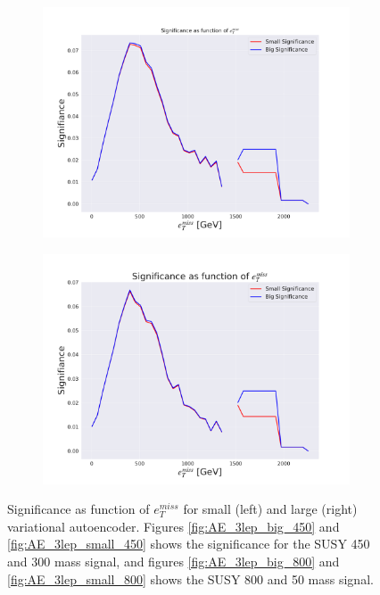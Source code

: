 \begin{figure}[H]
\begin{subfigure}{.45\textwidth}
        \includegraphics[width=\textwidth]{Figures/AE_testing/big/3lep/significance_etmiss_800p0p050p.pdf}
        \caption{}
        \label{fig:AE_3lep_big_800_signi}
    \end{subfigure}
    \hfill   
    \begin{subfigure}{.45\textwidth}
        \includegraphics[width=\textwidth]{Figures/AE_testing/small/3lep/significance_etmiss_800p0p050p.pdf}
        \caption{}
        \label{fig:AE_3lep_small_800_signi}
    \end{subfigure}
    \hfill      
    \caption[AE | Significance as function of $e_T^{miss}$]{Significance as function of $e_T^{miss}$ for small (left) and large (right) 
    variational autoencoder. Figures \ref{fig:AE_3lep_big_450} and \ref{fig:AE_3lep_small_450} shows the significance for the SUSY 450 
    and 300 mass signal, and figures \ref{fig:AE_3lep_big_800} and \ref{fig:AE_3lep_small_800} shows the SUSY 800 and 50 mass signal.}
    \label{fig:AE_3lep_recon_err_both_sig_signi}
\end{figure}

